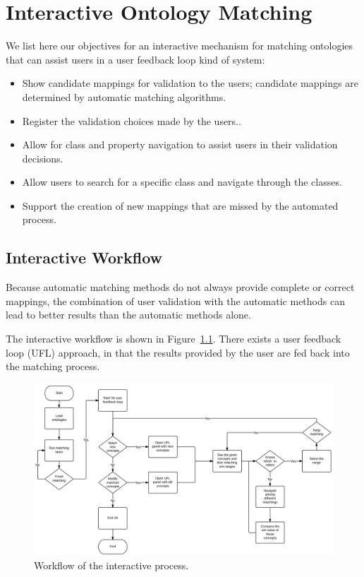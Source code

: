 \chapter{Interactive Ontology Matching}

We list here our objectives for an interactive mechanism for matching ontologies
that can assist users in a user feedback loop kind of system:
\begin{itemize}
	\item Show candidate mappings for validation to the users;
          candidate mappings are determined by automatic matching algorithms.
	\item Register the validation choices made by the users..
	\item Allow for class and property navigation to assist users
          in their validation decisions.
	\item Allow users to search for a specific class and navigate
          through the classes.
	\item Support the creation of new mappings that are missed by the automated process.
\end{itemize}


\section{Interactive Workflow} %
\label{sub:ambiguous_selection}
Because automatic matching methods do not always provide complete or
correct mappings, the combination of user validation with the
automatic methods can lead to better results than the automatic
methods alone. 

The interactive workflow is shown in
Figure~\ref{fig:workflow}. There exists a user feedback loop (UFL)
approach, in that the results provided by the user are fed back into
the matching process. %

\begin{figure}[!ht]
	\centering
	\includegraphics[width=6.5in]{pics/flow.png}
	\caption{Workflow of the interactive process.}
	\label{fig:workflow}
\end{figure}


